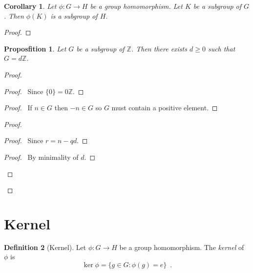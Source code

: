 \documentclass{book}
\let\qed\relax
\newtheorem{prop}{Proposfition}[chapter]
\newtheorem{cor}{Corollary}[prop]
\theoremstyle{definition}
\newtheorem{df}[prop]{Definition}
\newcommand{\inv}[1]{\ensuremath{{#1}^{-1}}}
\begin{document}
\begin{cor}
Let $\phi : G \rightarrow H$ be a group homomorphism. Let $K$ be a subgroup of $G$. Then $\phi(K)$ is a subgroup of $H$.
\end{cor}

\begin{proof}
\pf
{}
\step{3}{$x\inv{y} = \phi(a\inv{b})$}
\step{4}{$x\inv{y} \in \phi(K)$}
\qed
\end{proof}

\begin{prop}
\label{prop:subgroups-of-Z}
Let $G$ be a subgroup of $\mathbb{Z}$. Then there exists $d \geq 0$ such that $G = d \mathbb{Z}$.
\end{prop}

\begin{proof}
\pf
{}
\begin{proof}
\pf\ Since $\{0\} = 0 \mathbb{Z}$.
\end{proof}
\begin{proof}
\pf\ If $n \in G$ then $-n \in G$ so $G$ must contain a positive element.
\end{proof}
\begin{proof}
	\begin{proof}
		\pf\ Since $r = n - qd$.
	\end{proof}
	\begin{proof}
		\pf\ By minimality of $d$.
	\end{proof}
\end{proof}
\qed
\end{proof}

\section{Kernel}

\begin{df}[Kernel]
Let $\phi : G \rightarrow H$ be a group homomorphism. The \emph{kernel} of $\phi$ is
\[ \ker \phi = \{ g \in G : \phi(g) = e \} \enspace . \]
\end{df}
\end{document}
